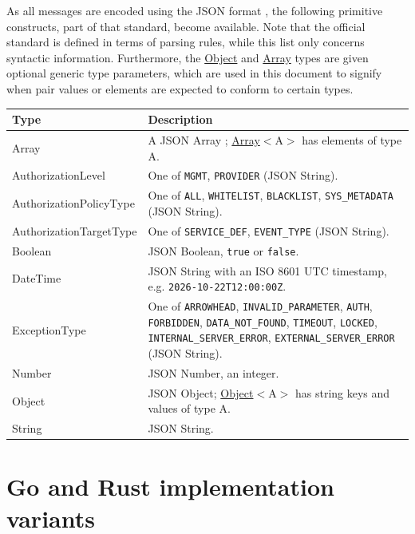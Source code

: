 \documentclass[a4paper]{arrowhead}
\newcommand{\pdef}[1]{{\textcolor{ArrowheadGrey}{#1 \label{sec:model:primitives:#1} \label{sec:model:primitives:#1s}}}}
\newcommand{\pref}[1]{{\textcolor{ArrowheadGrey}{\hyperref[sec:model:primitives:#1]{#1}}}}
\begin{document}
As all messages are encoded using the JSON format \cite{rfc8259}, the following primitive constructs, part of that standard, become available.
Note that the official standard is defined in terms of parsing rules, while this list only concerns syntactic information.
Furthermore, the \pref{Object} and \pref{Array} types are given optional generic type parameters, which are used in this document to signify when pair values or elements are expected to conform to certain types.

\noindent\begin{tabularx}{\textwidth}{| p{4.6cm} | X |} \hline
\rowcolor{gray!33} Type & Description \\ \hline
\pdef{Array} & A JSON Array \cite{rfc8259}; \pref{Array}$<$A$>$ has elements of type A. \\ \hline
\pdef{AuthorizationLevel} & One of \texttt{MGMT}, \texttt{PROVIDER} (JSON String). \\ \hline
\pdef{AuthorizationPolicyType} & One of \texttt{ALL}, \texttt{WHITELIST}, \texttt{BLACKLIST}, \texttt{SYS\_\allowbreak{}METADATA} (JSON String). \\ \hline
\pdef{AuthorizationTargetType} & One of \texttt{SERVICE\_\allowbreak{}DEF}, \texttt{EVENT\_\allowbreak{}TYPE} (JSON String). \\ \hline
\pdef{Boolean} & JSON Boolean, \texttt{true} or \texttt{false}. \\ \hline
\pdef{DateTime} & JSON String with an ISO 8601 UTC timestamp, e.g. \texttt{2026-10-22T12:00:00Z}. \\ \hline
\pdef{ExceptionType} & One of \texttt{ARROWHEAD}, \texttt{INVALID\_\allowbreak{}PARAMETER}, \texttt{AUTH}, \texttt{FORBIDDEN}, \texttt{DATA\_\allowbreak{}NOT\_\allowbreak{}FOUND}, \texttt{TIMEOUT}, \texttt{LOCKED}, \texttt{INTERNAL\_\allowbreak{}SERVER\_\allowbreak{}ERROR}, \texttt{EXTERNAL\_\allowbreak{}SERVER\_\allowbreak{}ERROR} (JSON String). \\ \hline
\pdef{Number} & JSON Number, an integer. \\ \hline
\pdef{Object} & JSON Object; \pref{Object}$<$A$>$ has string keys and values of type A. \\ \hline
\pdef{String} & JSON String. \\ \hline
\end{tabularx}

\newpage

\section{Go and Rust implementation variants}
\end{document}
